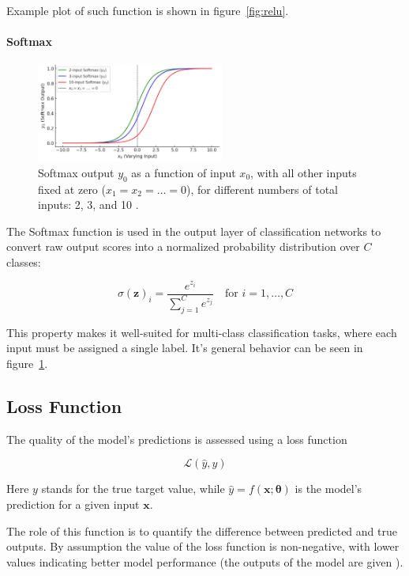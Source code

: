 \documentclass{pracalicmgr}
\begin{document}
Example plot of such function is shown in figure~\ref{fig:relu}.

\paragraph{Softmax}

\begin{figure}[H]
\centering
\includegraphics[width=0.55\textwidth]{src/softmax.pdf}
\caption{Softmax output $y_0$ as a function of input $x_0$, with all other inputs fixed at zero ($x_1 = x_2 = \ldots = 0$), for different numbers of total inputs: 2, 3, and 10 \cite{softmaxRef}.}
\label{fig:softmax}
\end{figure}

The Softmax function is used in the output layer of classification networks to convert raw output scores into a normalized probability distribution over \( C \) classes:

\[
\sigma(\mathbf{z})_i = \frac{e^{z_i}}{\sum_{j=1}^{C} e^{z_j}} \quad \text{for } i = 1, \dots, C
\]

This property makes it well-suited for multi-class classification tasks, where each input must be assigned a single label. It's general behavior can be seen in figure~\ref{fig:softmax}.

\subsection{Loss Function}

The quality of the model's predictions is assessed using a loss function 

\[
\mathcal{L}(\hat{y}, y)
\]

Here $y$ stands for the true target value, while \( \hat{y} = f(\mathbf{x}; \boldsymbol{\theta}) \) is the model's prediction for a given input \( \mathbf{x} \).

The role of this function is to quantify the difference between predicted and true outputs. By assumption the value of the loss function is non-negative, with lower values indicating better model performance (the outputs of the model are given ).
\end{document}
